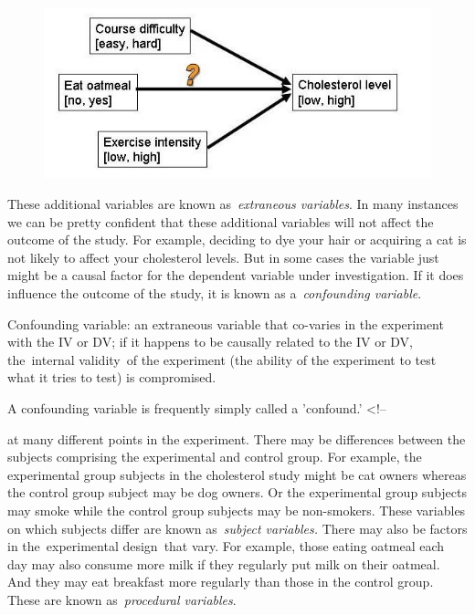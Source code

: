 \begin{refsection}
\begin{figure}[htbp]
\centering
\includegraphics[keepaspectratio,width=\textwidth,height=0.75\textheight]{cholesterolcausaldiagram.jpg}
\label{cholesterolcausaldiagram.jpg}
\end{figure}

These additional variables are known as \emph{extraneous variables}. In many instances we can be pretty confident that these additional variables will not affect the outcome of the study. For example, deciding to dye your hair or acquiring a cat is not likely to affect your cholesterol levels. But in some cases the variable just might be a causal factor for the dependent variable under investigation. If it does influence the outcome of the study, it is known as a \emph{confounding variable}.

\begin{thesis}\label{thesis:confoundingvariables}Confounding variable: an extraneous variable that co-varies in the experiment with the IV or DV; if it happens to be causally related to the IV or DV, the internal validity of the experiment (the ability of the experiment to test what it tries to test) is compromised. \newline

A confounding variable is frequently simply called a 'confound.'
<!--\end{thesis}

 at many different points in the experiment. There may be differences between the subjects comprising the experimental and control group. For example, the experimental group subjects in the cholesterol study might be cat owners whereas the control group subject may be dog owners. Or the experimental group subjects may smoke while the control group subjects may be non-smokers. These variables on which subjects differ are known as \emph{subject variables.}
There may also be factors in the experimental design that vary. For example, those eating oatmeal each day may also consume more milk if they regularly put milk on their oatmeal. And they may eat breakfast more regularly than those in the control group. These are known as \emph{procedural variables}.


\end{refsection}
